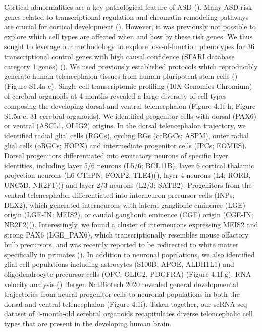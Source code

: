 Cortical abnormalities are a key pathological feature of ASD (\cite{torre-ubieta_advancing_2016,chen_emerging_2015}). Many ASD risk genes related to transcriptional regulation and chromatin remodeling pathways are crucial for cortical development (\cite{study_synaptic_2014,trevino_chromatin_2021}). However, it was previously not possible to explore which cell types are affected when and how by these risk genes. We thus sought to leverage our methodology to explore loss-of-function phenotypes for 36 transcriptional control genes with high causal confidence (SFARI database category 1 genes) (\cite{satterstrom_large-scale_2020}).
We used previously established protocols which reproducibly generate human telencephalon tissues from human pluripotent stem cells (\cite{lancaster_cerebral_2013,eichmuller_amplification_2022}) (Figure S1.4a-c). Single-cell transcriptomic profiling (10X Genomics Chromium) of cerebral organoids at 4 months revealed a large diversity of cell types composing the developing dorsal and ventral telencephalon (Figure 4.1f-h, Figure S1.5a-c; 31 cerebral organoids). We identified progenitor cells with dorsal (PAX6) or ventral (ASCL1, OLIG2) origins. In the dorsal telencephalon trajectory, we identified radial glial cells (RGCs), cycling RGs (ccRGCs; ASPM), outer radial glial cells (oRGCs; HOPX) and intermediate progenitor cells (IPCs; EOMES). Dorsal progenitors differentiated into excitatory neurons of specific layer identities, including layer 5/6 neurons (L5/6; BCL11B), layer 6 cortical thalamic projection neurons (L6 CThPN; FOXP2, TLE4)(\cite{tsyporin_transcriptional_2021}),  layer 4 neurons (L4; RORB, UNC5D, NR2F1)(\cite{zhong_identification_2004,oishi_identity_2016}) and layer 2/3 neurons (L2/3; SATB2). Progenitors from the ventral telencephalon differentiated into interneuron precursor cells (INPs; DLX2), which generated interneurons with lateral ganglionic eminence (LGE) origin (LGE-IN; MEIS2), or caudal ganglionic eminence (CGE) origin (CGE-IN; NR2F2)(\cite{shi_mouse_2021}). Interestingly, we found a cluster of interneurons expressing MEIS2 and strong PAX6 (LGE\_PAX6), which transcriptionally resembles mouse olfactory bulb precursors, and was recently reported to be redirected to white matter specifically in primates (\cite{schmitz_development_2022}). In addition to neuronal populations, we also identified glial cell populations including astrocytes (S100B, APOE, ALDH1L1) and oligodendrocyte precursor cells (OPC; OLIG2, PDGFRA) (Figure 4.1f-g). RNA velocity analysis (\cite{manno_rna_2018}) {Bergen NatBiotech 2020} revealed general developmental trajectories from neural progenitor cells to neuronal populations in both the dorsal and ventral telencephalon (Figure 4.1i). Taken together, our scRNA-seq dataset of 4-month-old cerebral organoids recapitulates diverse telencephalic cell types that are present in the developing human brain. 

